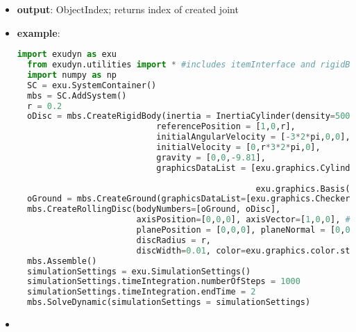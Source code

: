 \begin{itemize}[leftmargin=0.7cm]
\begin{itemize}[leftmargin=1.2cm]
\item[]{\it planePosition}: any 3D position vector of plane in ground object; given as local coordinates in ground object
\item[]{\it planeNormal}: 3D normal vector of the rolling (contact) plane on ground; given as local coordinates in ground object
\item[]{\it constrainedAxes}: [j0,j1,j2] flags, which determine which constraints are active, in which j0 represents the constraint for lateral motion, j1 longitudinal (forward/backward) motion and j2 represents the normal (contact) direction
\item[]{\it activeConnector}: flag to activate or deactivate the joint
\item[]{\it show}: if True, connector visualization is drawn
\item[]{\it discWidth}: disc with, only used for drawing
\item[]{\it color}: color of connector
\end{itemize}
\item[--]
{\bf output}: ObjectIndex; returns index of created joint
\item[--]
{\bf example}: \vspace{-12pt}\ei\begin{lstlisting}[language=Python, xleftmargin=36pt]
  import exudyn as exu
  from exudyn.utilities import * #includes itemInterface and rigidBodyUtilities
  import numpy as np
  SC = exu.SystemContainer()
  mbs = SC.AddSystem()
  r = 0.2
  oDisc = mbs.CreateRigidBody(inertia = InertiaCylinder(density=5000, length=0.1, outerRadius=r, axis=0),
                            referencePosition = [1,0,r],
                            initialAngularVelocity = [-3*2*pi,0,0],
                            initialVelocity = [0,r*3*2*pi,0],
                            gravity = [0,0,-9.81],
                            graphicsDataList = [exu.graphics.Cylinder(pAxis = [-0.05,0,0], vAxis = [0.1,0,0], radius = r*0.99,
                                                                      color=exu.graphics.color.blue),
                                                exu.graphics.Basis(length=2*r)])
  oGround = mbs.CreateGround(graphicsDataList=[exu.graphics.CheckerBoard(size=4)])
  mbs.CreateRollingDisc(bodyNumbers=[oGround, oDisc],
                        axisPosition=[0,0,0], axisVector=[1,0,0], #on local wheel frame
                        planePosition = [0,0,0], planeNormal = [0,0,1],  #in ground frame
                        discRadius = r,
                        discWidth=0.01, color=exu.graphics.color.steelblue)
  mbs.Assemble()
  simulationSettings = exu.SimulationSettings()
  simulationSettings.timeIntegration.numberOfSteps = 1000
  simulationSettings.timeIntegration.endTime = 2
  mbs.SolveDynamic(simulationSettings = simulationSettings)
\end{lstlisting}\vspace{-24pt}\bi\item[]\vspace{-24pt}\vspace{12pt}\end{itemize}
%

